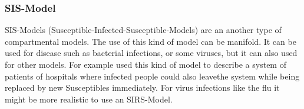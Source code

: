 \subsubsection{SIS-Model}
SIS-Models (Susceptible-Infected-Susceptible-Models) are an another type of compartmental models. The use of this kind of model can be manifold. It can be used for disease such as bacterial infections, or some viruses, but it can also used for other models. For example \citep{BEL16} used this kind of model to describe a system of patients of hospitals where infected people could also \glqq leave\grqq the system while being replaced by new Susceptibles immediately. For virus infections like the flu it might be more realistic to use an SIRS-Model.